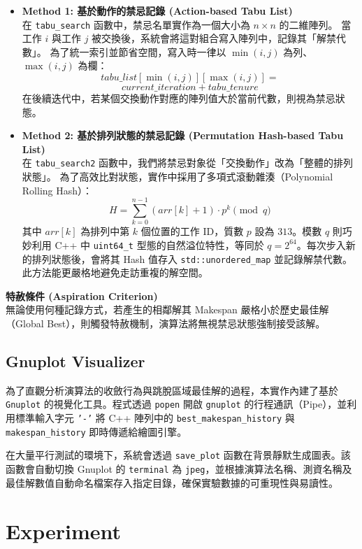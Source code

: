 \documentclass[conference]{IEEEtran}
\begin{document}
\begin{itemize}
    \item \textbf{Method 1: 基於動作的禁忌記錄 (Action-based Tabu List)} \\
在 \texttt{tabu\_search} 函數中，禁忌名單實作為一個大小為 $n \times n$ 的二維陣列。
當工作 $i$ 與工作 $j$ 被交換後，系統會將這對組合寫入陣列中，記錄其「解禁代數」。
為了統一索引並節省空間，寫入時一律以 $\min(i, j)$ 為列、$\max(i, j)$ 為欄：
$$tabu\_list[\min(i, j)][\max(i, j)] = $$
$$ current\_iteration + tabu\_tenure$$
在後續迭代中，若某個交換動作對應的陣列值大於當前代數，則視為禁忌狀態。
    \item \textbf{Method 2: 基於排列狀態的禁忌記錄 (Permutation Hash-based Tabu List)} \\
在 \texttt{tabu\_search2} 函數中，我們將禁忌對象從「交換動作」改為「整體的排列狀態」。
為了高效比對狀態，實作中採用了多項式滾動雜湊（Polynomial Rolling Hash）：
$$H = \sum_{k=0}^{n-1} (arr[k] + 1) \cdot p^k \pmod q$$
其中 $arr[k]$ 為排列中第 $k$ 個位置的工作 ID，質數 $p$ 設為 $313$。模數 $q$ 則巧妙利用 C++ 中 \texttt{uint64\_t} 型態的自然溢位特性，等同於 $q = 2^{64}$。每次步入新的排列狀態後，會將其 Hash 值存入 \texttt{std::unordered\_map} 並記錄解禁代數。此方法能更嚴格地避免走訪重複的解空間。

\end{itemize}


\textbf{特赦條件 (Aspiration Criterion)} \\
無論使用何種記錄方式，若產生的相鄰解其 Makespan 嚴格小於歷史最佳解（Global Best），則觸發特赦機制，演算法將無視禁忌狀態強制接受該解。

\subsection{Gnuplot Visualizer}
為了直觀分析演算法的收斂行為與跳脫區域最佳解的過程，本實作內建了基於 \texttt{Gnuplot} 的視覺化工具。程式透過 \texttt{popen} 開啟 \texttt{gnuplot} 的行程通訊（Pipe），並利用標準輸入字元 \texttt{'-'} 將 C++ 陣列中的 \texttt{best\_makespan\_history} 與 \texttt{makespan\_history} 即時傳遞給繪圖引擎。

在大量平行測試的環境下，系統會透過 \texttt{save\_plot} 函數在背景靜默生成圖表。該函數會自動切換 Gnuplot 的 \texttt{terminal} 為 \texttt{jpeg}，並根據演算法名稱、測資名稱及最佳解數值自動命名檔案存入指定目錄，確保實驗數據的可重現性與易讀性。


\section{Experiment}
\fontsize{10pt}{12pt}\selectfont
\end{document}
